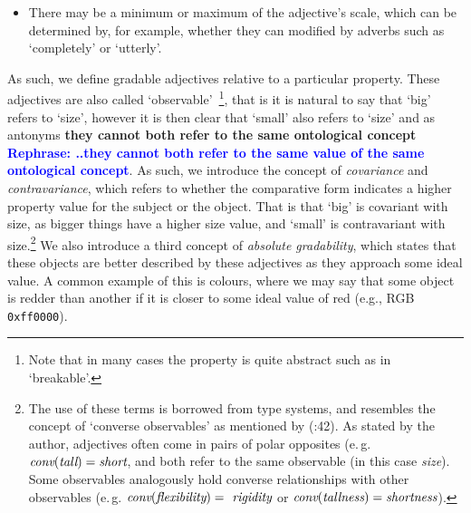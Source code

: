 \documentclass[11pt]{article}
\begin{document}
\begin{itemize}[noitemsep]
\item There may be a minimum or maximum of the adjective's scale, which can be determined
by, for example, whether they can modified by adverbs such as `completely' or `utterly'.
\end{itemize}

As such, we define gradable adjectives relative to a particular 
property. These adjectives are also called `observable'~\cite{Bennett06kr}\footnote{Note that in many cases the property is quite abstract such as in 
`breakable'.}, that is it is natural to say that `big' refers to 
`size', however it is then clear that `small' also refers to `size' and as antonyms 
\textbf{they cannot both refer to the same ontological concept \textcolor{blue}{Rephrase: ..they cannot both refer to the same value of the same ontological concept}}. As such, we introduce 
the concept of \emph{covariance} and \emph{contravariance}, which refers to 
whether the comparative form indicates a higher property value for the subject 
or the object. That is that `big' is covariant with size, as bigger things have 
a higher size value, and `small' is contravariant with size.\footnote{
    The use of these terms is borrowed from type systems, and resembles the concept of `converse observables' as mentioned by (\cite{Bennett06kr}:42). As stated by the author, adjectives often come in pairs of polar opposites (e.\,g. $\text{\em conv}(\text{\em tall})=\text{\em short}$, and both refer to the same observable (in this case \textit{size}). Some observables analogously hold converse relationships with other observables (e.\,g. $\text{\em conv}(\text{\em flexibility})=\text{\em rigidity}$ or $\text{\em conv}(\text{\em tallness})=\text{\em shortness}$).} 
    We also introduce 
a third concept of \emph{absolute gradability}, which states that these objects 
are better described by these adjectives as they approach some ideal value. 
A common example of this is colours, where we may say that some object is 
redder than another if it is closer to some ideal value of red 
(e.g., RGB {\tt 0xff0000}).
\end{document}
